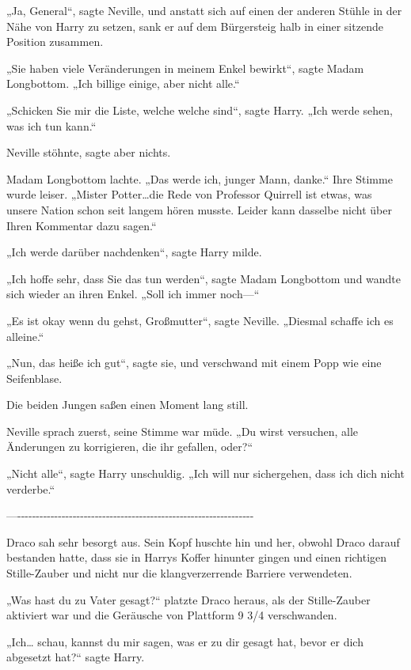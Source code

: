 {„Ja, General“, sagte Neville, und anstatt sich auf einen der anderen Stühle in der Nähe von Harry zu setzen, sank er auf dem Bürgersteig halb in einer sitzende Position zusammen.

„Sie haben viele Veränderungen in meinem Enkel bewirkt“, sagte Madam Longbottom. „Ich billige einige, aber nicht alle.“

„Schicken Sie mir die Liste, welche welche sind“, sagte Harry. „Ich werde sehen, was ich tun kann.“

Neville stöhnte, sagte aber nichts.

Madam Longbottom lachte. „Das werde ich, junger Mann, danke.“ Ihre Stimme wurde leiser. „Mister Potter…die Rede von Professor Quirrell ist etwas, was unsere Nation schon seit langem hören musste. Leider kann dasselbe nicht über Ihren Kommentar dazu sagen.“

„Ich werde darüber nachdenken“, sagte Harry milde.

„Ich hoffe sehr, dass Sie das tun werden“, sagte Madam Longbottom und wandte sich wieder an ihren Enkel. „Soll ich immer noch—“

„Es ist okay wenn du gehst, Großmutter“, sagte Neville. „Diesmal schaffe ich es alleine.“

„Nun, das heiße ich gut“, sagte sie, und verschwand mit einem Popp wie eine Seifenblase.

Die beiden Jungen saßen einen Moment lang still.

Neville sprach zuerst, seine Stimme war müde. „Du wirst versuchen, alle Änderungen zu korrigieren, die ihr gefallen, oder?“

„Nicht alle“, sagte Harry unschuldig. „Ich will nur sichergehen, dass ich dich nicht verderbe.“

—\/-\/-\/-\/-\/-\/-\/-\/-\/-\/-\/-\/-\/-\/-\/-\/-\/-\/-\/-\/-\/-\/-\/-\/-\/-\/-\/-\/-\/-\/-\/-\/-\/-\/-\/-\/-\/-\/-\/-\/-\/-\/-\/-\/-\/-\/-\/-\/-\/-\/-\/-\/-\/-\/-\/-\/-\/-\/-\/-\/-\/-\/-\/-\/-

Draco sah sehr besorgt aus. Sein Kopf huschte hin und her, obwohl Draco darauf bestanden hatte, dass sie in Harrys Koffer hinunter gingen und einen richtigen Stille-Zauber und nicht nur die klangverzerrende Barriere verwendeten.

„Was hast du zu Vater gesagt?“ platzte Draco heraus, als der Stille-Zauber aktiviert war und die Geräusche von Plattform 9 3/4 verschwanden.

„Ich… schau, kannst du mir sagen, was er zu dir gesagt hat, bevor er dich abgesetzt hat?“ sagte Harry.

}

